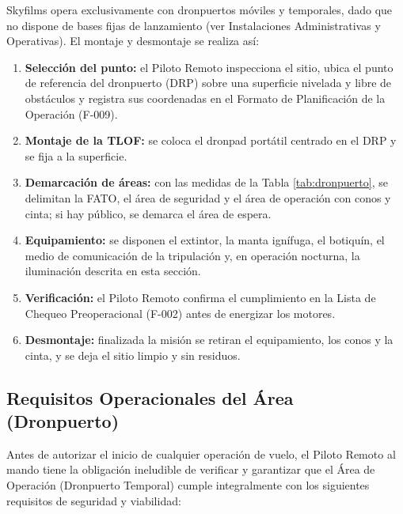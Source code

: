 Skyfilms opera exclusivamente con dronpuertos móviles y temporales, dado que no dispone de bases fijas de lanzamiento (ver Instalaciones Administrativas y Operativas). El montaje y desmontaje se realiza así:

\begin{enumerate}
\item \textbf{Selección del punto:} el Piloto Remoto inspecciona el sitio, ubica el punto de referencia del dronpuerto (DRP) sobre una superficie nivelada y libre de obstáculos y registra sus coordenadas en el Formato de Planificación de la Operación (F-009).
\item \textbf{Montaje de la TLOF:} se coloca el dronpad portátil centrado en el DRP y se fija a la superficie.
\item \textbf{Demarcación de áreas:} con las medidas de la Tabla \ref{tab:dronpuerto}, se delimitan la FATO, el área de seguridad y el área de operación con conos y cinta; si hay público, se demarca el área de espera.
\item \textbf{Equipamiento:} se disponen el extintor, la manta ignífuga, el botiquín, el medio de comunicación de la tripulación y, en operación nocturna, la iluminación descrita en esta sección.
\item \textbf{Verificación:} el Piloto Remoto confirma el cumplimiento en la Lista de Chequeo Preoperacional (F-002) antes de energizar los motores.
\item \textbf{Desmontaje:} finalizada la misión se retiran el equipamiento, los conos y la cinta, y se deja el sitio limpio y sin residuos.
\end{enumerate}

\subsection{Requisitos Operacionales del Área (Dronpuerto)}

Antes de autorizar el inicio de cualquier operación de vuelo, el Piloto Remoto al mando tiene la obligación ineludible de verificar y garantizar que el Área de Operación (Dronpuerto Temporal) cumple integralmente con los siguientes requisitos de seguridad y viabilidad:

